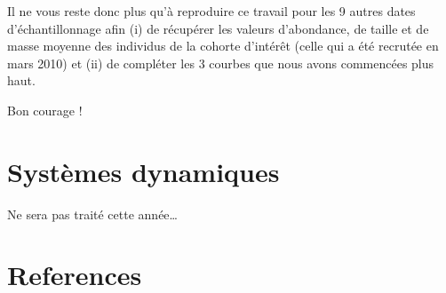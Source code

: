 \documentclass[
  a4paper,
  DIV=11,
  numbers=noendperiod,
  oneside]{scrreprt}
\begin{document}
Il ne vous reste donc plus qu'à reproduire ce travail pour les 9 autres
dates d'échantillonnage afin (i) de récupérer les valeurs d'abondance,
de taille et de masse moyenne des individus de la cohorte d'intérêt
(celle qui a été recrutée en mars 2010) et (ii) de compléter les 3
courbes que nous avons commencées plus haut.

Bon courage !


\hypertarget{sec-dynam}{%
\chapter{Systèmes dynamiques}\label{sec-dynam}}

Ne sera pas traité cette année\ldots{}


\hypertarget{references}{%
\chapter*{References}\label{references}}

\end{document}
